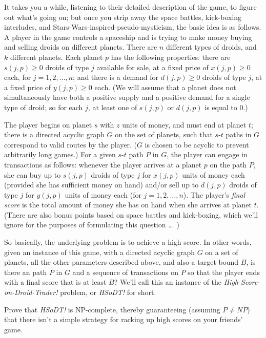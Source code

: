 \documentclass[12pt]{article}
\begin{document}
\begin{enumerate}
It takes you a while, listening to their detailed description
of the game, to figure out what's going on;
but once you strip away the space battles, kick-boxing interludes,
and Stars-Wars-inspired-pseudo-mysticism,
the basic idea is as follows.
A player in the game controls a spaceship and
is trying to make money buying and selling droids on different planets.
There are $n$ different types of droids,
and $k$ different planets.
Each planet $p$ has the following properties:
there are $s(j,p) \geq 0$ droids of type $j$ available for sale,
at a fixed price of $x(j,p) \geq 0$ each, for $j = 1, 2, \ldots, n$;
and there is a demand for $d(j,p) \geq 0$ droids of type $j$,
at a fixed price of $y(j,p) \geq 0$ each.
(We will assume that a planet does not simultaneously
have both a positive supply and a positive demand for a single type of droid;
so for each $j$, at least one of $s(j,p)$ or $d(j,p)$ is equal to $0$.)

The player begins on planet $s$ with $z$ units of money,
and must end at planet $t$;
there is a directed acyclic graph $G$ on the set of planets,
such that $s$-$t$ paths in $G$ correspond to
valid routes by the player.
($G$ is chosen to be acyclic to prevent arbitrarily long games.)
For a given $s$-$t$ path $P$ in $G$, the player can engage
in transactions as follows:
whenever the player arrives at a planet $p$ on the path $P$,
she can buy up to $s(j,p)$ droids of type $j$ for $x(j,p)$ units of money each
(provided she has sufficient money on hand)
and/or sell up to $d(j,p)$ droids of type $j$ for $y(j,p)$ units of money each
(for $j = 1, 2, \ldots, n$).
The player's {\em final score} is the total amount of
money she has on hand when she arrives at planet $t$.
(There are also bonus points based on space battles and kick-boxing,
which we'll ignore for the purposes of formulating this question \ldots\ )

So basically, the underlying problem is to achieve a high score.
In other words, given an instance of this game,
with a directed acyclic graph $G$ on a set of planets,
all the other parameters described above,
and also a target bound $B$,
is there an path $P$ in $G$ and a sequence of transactions
on $P$ so that the player ends with a final score
that is at least $B$?
We'll call this an instance of the
{\em High-Score-on-Droid-Trader!} problem,
or {\em HSoDT!} for short.

Prove that {\em HSoDT!} is NP-complete, thereby
guaranteeing (assuming $P \neq NP$) that there isn't
a simple strategy for racking up high scores on your friends' game.


\end{enumerate}
\end{document}
